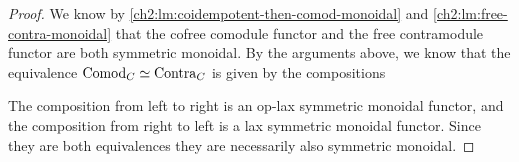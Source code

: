\begin{proof}


    We know by \cref{ch2:lm:coidempotent-then-comod-monoidal} and \cref{ch2:lm:free-contra-monoidal} that the cofree comodule functor and the free contramodule functor are both symmetric monoidal. By the arguments above, we know that the equivalence $\mathrm{Comod}_C\simeq \mathrm{Contra}_C$ is given by the compositions 
    \begin{center}
    \end{center}
    The composition from left to right is an op-lax symmetric monoidal functor, and the composition from right to left is a lax symmetric monoidal functor. Since they are both equivalences they are necessarily also symmetric monoidal. 
\end{proof}

